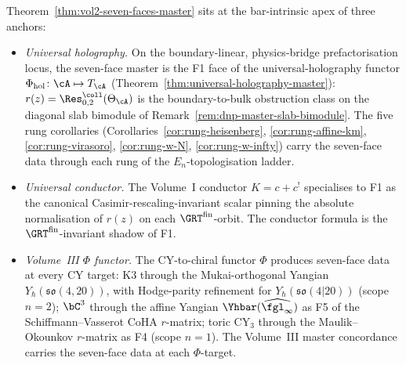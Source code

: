 \begin{remark}
\label{rem:dnp-master-climax-anchors}
Theorem~\ref{thm:vol2-seven-faces-master} sits at the
bar-intrinsic apex of three anchors:
\begin{itemize}
\item[(a)] \emph{Universal holography.} On the boundary-linear,
 physics-bridge prefactorisation locus, the seven-face master is
 the F1 face of the universal-holography functor
 $\Phi_{\mathrm{hol}}\colon \cA \mapsto T_{\cA}$
 (Theorem~\ref{thm:universal-holography-master}):
 $r(z) = \Res^{\coll}_{0,2}(\Theta_{\cA})$ is the boundary-to-bulk
 obstruction class on the diagonal slab bimodule of
 Remark~\ref{rem:dnp-master-slab-bimodule}. The five rung
 corollaries (Corollaries~\ref{cor:rung-heisenberg},
 \ref{cor:rung-affine-km}, \ref{cor:rung-virasoro},
 \ref{cor:rung-w-N}, \ref{cor:rung-w-infty}) carry the seven-face
 data through each rung of the $E_n$-topologisation ladder.
\item[(b)] \emph{Universal conductor.} The Volume~I conductor
 $K = c + c^{!}$ specialises to F1 as the canonical
 Casimir-rescaling-invariant scalar pinning the absolute
 normalisation of $r(z)$ on each $\GRT^{\mathrm{fin}}$-orbit. The
 conductor formula is the $\GRT^{\mathrm{fin}}$-invariant shadow
 of F1.
\item[(c)] \emph{Volume~III $\Phi$ functor.} The CY-to-chiral
 functor $\Phi$ produces seven-face data at every CY target: K3
 through the Mukai-orthogonal Yangian
 $Y_{\hbar}(\mathfrak{so}(4,20))$, with Hodge-parity refinement
 for $Y_{\hbar}(\mathfrak{so}(4|20))$ (scope $n=2$);
 $\bC^{3}$ through the affine Yangian
 $\Yhbar(\widehat{\fgl_{\infty}})$ as F5 of the
 Schiffmann--Vasserot CoHA $r$-matrix; toric CY${}_{3}$ through
 the Maulik--Okounkov $r$-matrix as F4 (scope $n=1$). The
 Volume~III master concordance carries the seven-face data at
 each $\Phi$-target.
\end{itemize}
\end{remark}
